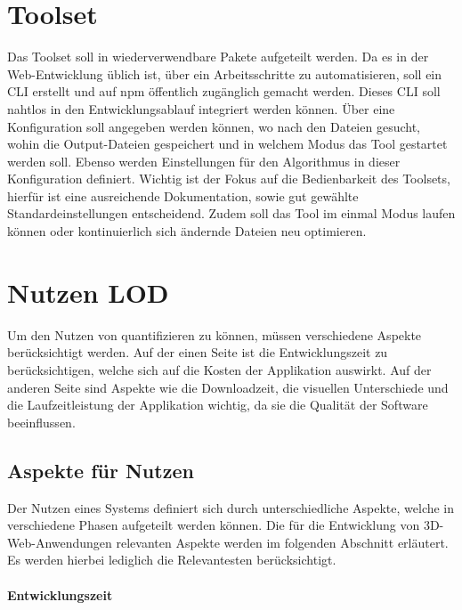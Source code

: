 \section{Toolset}
Das Toolset soll in wiederverwendbare Pakete aufgeteilt werden.
Da es in der Web-Entwicklung üblich ist, über ein  Arbeitsschritte zu automatisieren, soll ein \gls{CLI} erstellt und auf \gls{npm} öffentlich zugänglich gemacht werden. Dieses \gls{CLI} soll nahtlos in den Entwicklungsablauf integriert werden können. Über eine Konfiguration soll angegeben werden können, wo nach den  Dateien gesucht, wohin die Output-Dateien gespeichert und in welchem Modus das Tool gestartet werden soll. Ebenso werden Einstellungen für den Algorithmus in dieser Konfiguration definiert. Wichtig ist der Fokus auf die Bedienbarkeit des Toolsets, hierfür ist eine ausreichende Dokumentation, sowie gut gewählte Standardeinstellungen entscheidend. Zudem soll das Tool im einmal Modus laufen können oder kontinuierlich sich ändernde Dateien neu optimieren.

\section{Nutzen LOD}
Um den Nutzen von  quantifizieren zu können, müssen verschiedene Aspekte berücksichtigt werden. Auf der einen Seite ist die Entwicklungszeit zu berücksichtigen, welche sich auf die Kosten der Applikation auswirkt. Auf der anderen Seite sind Aspekte wie die Downloadzeit, die visuellen Unterschiede und die Laufzeitleistung der Applikation wichtig, da sie die Qualität der Software beeinflussen.

\subsection{Aspekte für Nutzen}

Der Nutzen eines Systems definiert sich durch unterschiedliche Aspekte, welche in verschiedene Phasen aufgeteilt werden können. Die für die Entwicklung von 3D-Web-Anwendungen relevanten Aspekte werden im folgenden Abschnitt erläutert. Es werden hierbei lediglich die Relevantesten berücksichtigt.

\paragraph{Entwicklungszeit}

